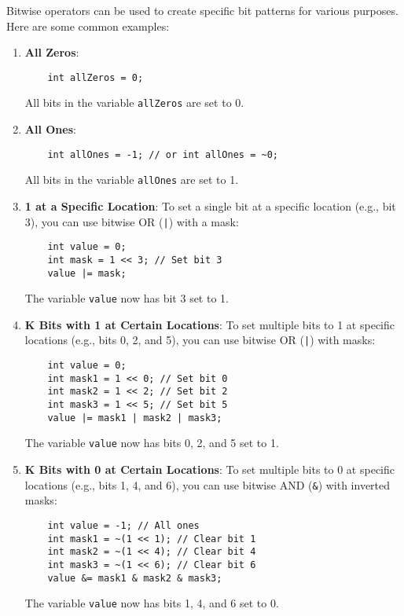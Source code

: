 \documentclass{article}
\begin{document}
Bitwise operators can be used to create specific bit patterns for various purposes. Here are some common examples:

\begin{enumerate}
    \item \textbf{All Zeros}:
    \begin{verbatim}
    int allZeros = 0;
    \end{verbatim}
    All bits in the variable \texttt{allZeros} are set to 0.

    \item \textbf{All Ones}:
    \begin{verbatim}
    int allOnes = -1; // or int allOnes = ~0;
    \end{verbatim}
    All bits in the variable \texttt{allOnes} are set to 1.

    \item \textbf{1 at a Specific Location}:
    To set a single bit at a specific location (e.g., bit 3), you can use bitwise OR (\texttt{|}) with a mask:
    \begin{verbatim}
    int value = 0;
    int mask = 1 << 3; // Set bit 3
    value |= mask;
    \end{verbatim}
    The variable \texttt{value} now has bit 3 set to 1.

    \item \textbf{K Bits with 1 at Certain Locations}:
    To set multiple bits to 1 at specific locations (e.g., bits 0, 2, and 5), you can use bitwise OR (\texttt{|}) with masks:
    \begin{verbatim}
    int value = 0;
    int mask1 = 1 << 0; // Set bit 0
    int mask2 = 1 << 2; // Set bit 2
    int mask3 = 1 << 5; // Set bit 5
    value |= mask1 | mask2 | mask3;
    \end{verbatim}
    The variable \texttt{value} now has bits 0, 2, and 5 set to 1.

    \item \textbf{K Bits with 0 at Certain Locations}:
    To set multiple bits to 0 at specific locations (e.g., bits 1, 4, and 6), you can use bitwise AND (\texttt{\&}) with inverted masks:
    \begin{verbatim}
    int value = -1; // All ones
    int mask1 = ~(1 << 1); // Clear bit 1
    int mask2 = ~(1 << 4); // Clear bit 4
    int mask3 = ~(1 << 6); // Clear bit 6
    value &= mask1 & mask2 & mask3;
    \end{verbatim}
    The variable \texttt{value} now has bits 1, 4, and 6 set to 0.

\end{enumerate}
\end{document}
